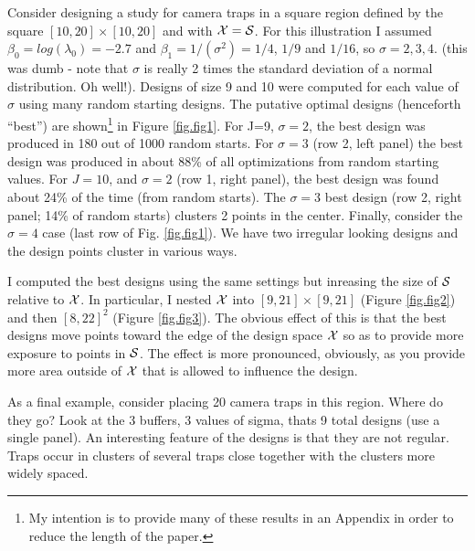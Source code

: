 \documentclass[useAMS,referee]{biom}
\begin{document}
Consider designing a study for camera traps in a square region defined
by the square $[10,20] \times [10, 20]$ and with ${\cal X} = {\cal
  S}$.  For this illustration I assumed $\beta_{0} = log(\lambda_{0})
= -2.7$ and $\beta_{1} = 1/(\sigma^{2}) = 1/4$, $1/9$ and $1/16$, so
$\sigma = 2,3,4$. (this was dumb - note that $\sigma$ is really 2
times the standard deviation of a normal distribution. Oh well!).
Designs of size 9 and 10 were computed for each value of $\sigma$
using many random starting designs.  The putative optimal designs
(henceforth ``best'') are shown\footnote{My intention is to provide
  many of these results in an Appendix in order to reduce the length
  of the paper.} in Figure \ref{fig.fig1}.  For J=9, $\sigma =2$, the
best design was produced in 180 out of 1000 random starts.  For
$\sigma = 3$ (row 2, left panel) the best design was produced in about
88\% of all optimizations from random starting values.
For $J=10$, and $\sigma =2$ (row 1, right panel), the best design was
found about 24\% of the time (from random starts). 
The $\sigma = 3$ best design (row 2, right
panel; 14\% of random starts) clusters 2 points in the center.
Finally, consider the $\sigma =4$ case (last row of
Fig. \ref{fig.fig1}).  We have two irregular looking designs and 
the design points cluster in various ways. 

I computed the best designs using the same settings but inreasing the
size of ${\cal S}$ relative to ${\cal X}$.  In particular, I nested
${\cal X}$ into $[9,21] \times [9,21]$ (Figure \ref{fig.fig2})
 and then $[8,22]^{2}$ (Figure \ref{fig.fig3}).
The obvious effect of this is
that the best designs move points toward the edge of the design space
${\cal X}$ so as to provide more exposure to points in ${\cal S}$.
The effect is more pronounced, obviously, as you provide more area
outside of ${\cal X}$ that is allowed to influence the design.

As a final example, 
consider placing 20 camera traps in this region. Where do they
go? Look at the 3 buffers, 3 values of sigma, thats 9 total designs
(use a single panel).
An interesting feature of the designs is that they are not
regular. Traps occur in clusters of several traps close together
with the clusters more widely spaced.
\end{document}

